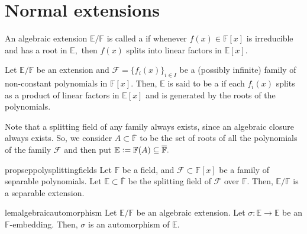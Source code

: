 \chapter{Normal extensions}

\begin{defn}%
    An algebraic extension $\mathbb{E}/\mathbb{F}$ is called a  if whenever $f(x) \in \mathbb{F}[x]$ is irreducible and has a root in $\mathbb{E},$ then $f(x)$ splits into linear factors in $\mathbb{E}[x].$ 
\end{defn}

\begin{defn}%
    Let $\mathbb{E}/\mathbb{F}$ be an extension and $\mathcal{F} = \{f_i(x)\}_{i \in I}$ be a (possibly infinite) family of non-constant polynomials in $\mathbb{F}[x].$ Then, $\mathbb{E}$ is said to be a  if each $f_i(x)$ splits as a product of linear factors in $\mathbb{E}[x]$ and is generated by the roots of the polynomials.
\end{defn}

\begin{rem} \label{rem:splitfamilyexists}
    Note that a splitting field of any family always exists, since an algebraic closure always exists. So, we consider $A \subset \overline{\mathbb{F}}$ to be the set of roots of all the polynomials of the family $\mathcal{F}$ and then put $\mathbb{E} \vcentcolon= \mathbb{F}(A) \subset \overline{\mathbb{F}}.$
\end{rem}

\begin{restatable}[]{prop}{seppolysplittingfields}
\label{prop:seppolysplittingfields}
    Let $\mathbb{F}$ be a field, and $\mathcal{F} \subset \mathbb{F}[x]$ be a family of separable polynomials. Let $\mathbb{E} \subset \overline{\mathbb{F}}$ be the splitting field of $\mathcal{F}$ over $\mathbb{F}.$ Then, $\mathbb{E}/\mathbb{F}$ is a separable extension. \hfill\hyperref[prop:seppolysplittingfields2]{\downsym}
\end{restatable}

\begin{restatable}[]{lem}{algebraicautomorphism}
\label{lem:algebraicautomorphism}
    Let $\mathbb{E}/\mathbb{F}$ be an algebraic extension. Let $\sigma : \mathbb{E} \to \mathbb{E}$ be an $\mathbb{F}$-embedding. Then, $\sigma$ is an automorphism of $\mathbb{E}.$ \hfill\hyperref[lem:algebraicautomorphism2]{\downsym}
\end{restatable}

